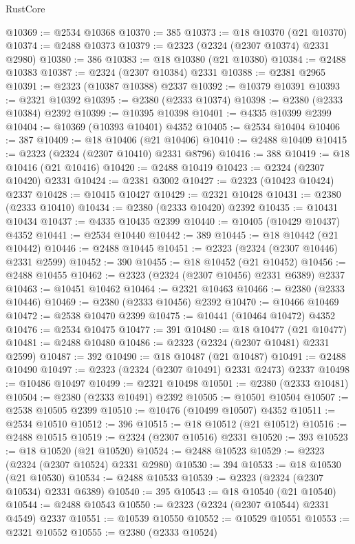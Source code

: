\begin{lexlean}{RustCore}
\begin{coremodule}
@10369 := @2534 @10368
@10370 := 385
@10373 := @18 @10370 (@21 @10370)
@10374 := @2488 @10373
@10379 := @2323 (@2324 (@2307 @10374) @2331 @2980)
@10380 := 386
@10383 := @18 @10380 (@21 @10380)
@10384 := @2488 @10383
@10387 := @2324 (@2307 @10384) @2331
@10388 := @2381 @2965
@10391 := @2323 (@10387 @10388) @2337
@10392 := @10379 @10391
@10393 := @2321 @10392
@10395 := @2380 (@2333 @10374)
@10398 := @2380 (@2333 @10384) @2392
@10399 := @10395 @10398
@10401 := @4335 @10399 @2399
@10404 := @10369 (@10393 @10401) @4352
@10405 := @2534 @10404
@10406 := 387
@10409 := @18 @10406 (@21 @10406)
@10410 := @2488 @10409
@10415 := @2323 (@2324 (@2307 @10410) @2331 @8796)
@10416 := 388
@10419 := @18 @10416 (@21 @10416)
@10420 := @2488 @10419
@10423 := @2324 (@2307 @10420) @2331
@10424 := @2381 @3002
@10427 := @2323 (@10423 @10424) @2337
@10428 := @10415 @10427
@10429 := @2321 @10428
@10431 := @2380 (@2333 @10410)
@10434 := @2380 (@2333 @10420) @2392
@10435 := @10431 @10434
@10437 := @4335 @10435 @2399
@10440 := @10405 (@10429 @10437) @4352
@10441 := @2534 @10440
@10442 := 389
@10445 := @18 @10442 (@21 @10442)
@10446 := @2488 @10445
@10451 := @2323 (@2324 (@2307 @10446) @2331 @2599)
@10452 := 390
@10455 := @18 @10452 (@21 @10452)
@10456 := @2488 @10455
@10462 := @2323 (@2324 (@2307 @10456) @2331 @6389) @2337
@10463 := @10451 @10462
@10464 := @2321 @10463
@10466 := @2380 (@2333 @10446)
@10469 := @2380 (@2333 @10456) @2392
@10470 := @10466 @10469
@10472 := @2538 @10470 @2399
@10475 := @10441 (@10464 @10472) @4352
@10476 := @2534 @10475
@10477 := 391
@10480 := @18 @10477 (@21 @10477)
@10481 := @2488 @10480
@10486 := @2323 (@2324 (@2307 @10481) @2331 @2599)
@10487 := 392
@10490 := @18 @10487 (@21 @10487)
@10491 := @2488 @10490
@10497 := @2323 (@2324 (@2307 @10491) @2331 @2473) @2337
@10498 := @10486 @10497
@10499 := @2321 @10498
@10501 := @2380 (@2333 @10481)
@10504 := @2380 (@2333 @10491) @2392
@10505 := @10501 @10504
@10507 := @2538 @10505 @2399
@10510 := @10476 (@10499 @10507) @4352
@10511 := @2534 @10510
@10512 := 396
@10515 := @18 @10512 (@21 @10512)
@10516 := @2488 @10515
@10519 := @2324 (@2307 @10516) @2331
@10520 := 393
@10523 := @18 @10520 (@21 @10520)
@10524 := @2488 @10523
@10529 := @2323 (@2324 (@2307 @10524) @2331 @2980)
@10530 := 394
@10533 := @18 @10530 (@21 @10530)
@10534 := @2488 @10533
@10539 := @2323 (@2324 (@2307 @10534) @2331 @6389)
@10540 := 395
@10543 := @18 @10540 (@21 @10540)
@10544 := @2488 @10543
@10550 := @2323 (@2324 (@2307 @10544) @2331 @4549) @2337
@10551 := @10539 @10550
@10552 := @10529 @10551
@10553 := @2321 @10552
@10555 := @2380 (@2333 @10524)

\end{coremodule}
\end{lexlean}
